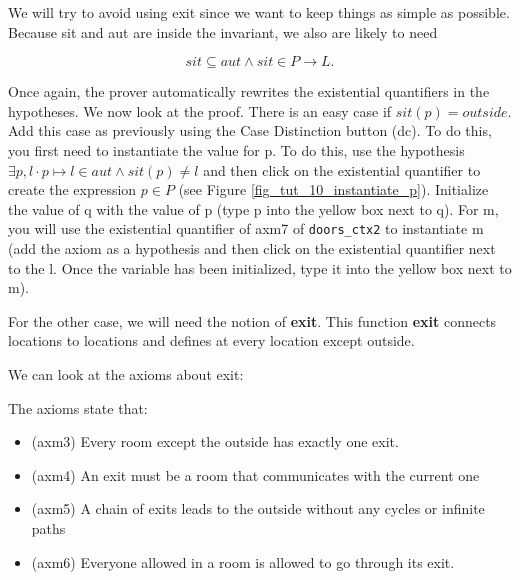 We will try to avoid using \textsf{exit} since we want to keep things as simple as possible. Because \textsf{sit} and \textsf{aut} are inside the invariant, we also are likely to need 

\[
sit \subseteq aut \land sit \in P \mathbin \rightarrow L.
\]

Once again, the prover automatically rewrites the existential quantifiers in the hypotheses. We now look at the proof. There is an easy case if $sit(p) = outside$. Add this case as previously using the \textsf{Case Distinction button (dc)}. To do this, you first need to instantiate the value for p. To do this, use the hypothesis $\exists p, l \cdot p \mapsto l \in aut \land sit(p) \neq l$ and then click on the existential quantifier to create the expression $ p \in P $ (see Figure \ref{fig_tut_10_instantiate_p}). Initialize the value of \textsf{q} with the value of \textsf{p} (type p into the yellow box next to q). For \textsf{m}, you will use the existential quantifier of \textsf{axm7} of \texttt{doors\_ctx2} to instantiate \textsf{m} (add the axiom as a hypothesis and then click on the existential quantifier next to the l. Once the variable has been initialized, type it into the yellow box next to m).

For the other case, we will need the notion of \textbf{exit}. This function \textbf{exit} connects locations to locations and defines at every location except \textsf{outside}.

We can look at the axioms about \textsf{exit}:

\begin{description}
\AXIOMS
	\begin{description}
	\end{description}
\end{description}

The axioms state that:

\begin{itemize}
	\item (axm3) Every room except the outside has exactly one exit. 
	\item (axm4) An exit must be a room that communicates with the current one
	\item (axm5) A chain of exits leads to the outside without any cycles or infinite paths
	\item (axm6) Everyone allowed in a room is allowed to go through its exit. 
\end{itemize}  

